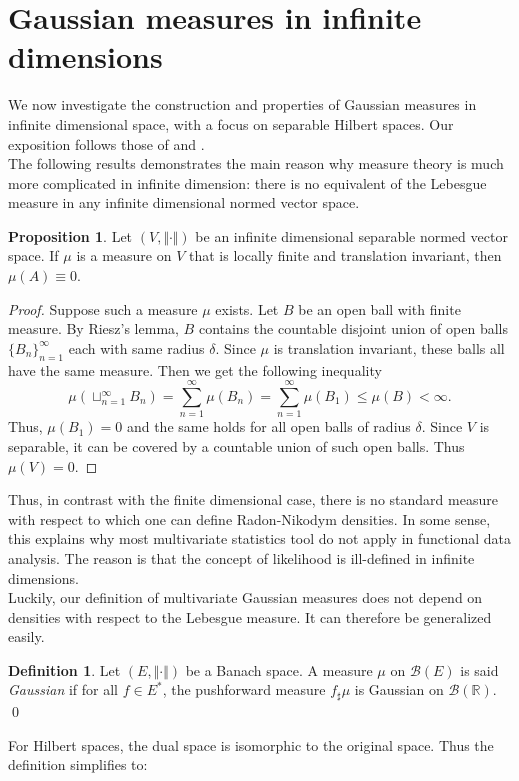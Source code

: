 \documentclass[10pt, a4paper]{report}
\newcommand{\R}[0]{\mathbb{R}}
\theoremstyle{definition}
\newtheorem{prop}{Proposition}
\newtheorem{definition}{Definition}
\theoremstyle{remark}
\begin{document}
\section{Gaussian measures in infinite dimensions}
We now investigate the construction and properties of Gaussian measures in infinite dimensional space, with a focus on separable Hilbert spaces. Our exposition follows those of \cite{prato1} and \cite{prato2}.\\
The following results demonstrates the main reason why measure theory is much more complicated in infinite dimension: there is no equivalent of the Lebesgue measure in any infinite dimensional normed vector space.
\begin{prop}
	Let $(V,\Vert \cdot \Vert)$ be an infinite dimensional separable normed vector space. If $\mu$ is a measure on $V$ that is locally finite and translation invariant, then $\mu(A) \equiv 0$. 
	\begin{proof}
		Suppose such a measure $\mu$ exists. Let $B$ be an open ball with finite measure. By Riesz's lemma, $B$ contains the countable disjoint union of open balls $\{B_n\}_{n=1}^\infty$ each with same radius $\delta$. Since $\mu$ is translation invariant, these balls all have the same measure. Then we get the following inequality
		$$\mu\left(\sqcup_{n=1}^\infty B_n\right) = \sum_{n=1}^{\infty}\mu(B_n) = \sum_{n=1}^{\infty}\mu(B_1) \leq \mu(B) < \infty.$$
		Thus, $\mu(B_1)=0$ and the same holds for all open balls of radius $\delta$. Since $V$ is separable, it can be covered by a countable union of such open balls. Thus $\mu(V)=0$.
	\end{proof}
\end{prop}
Thus, in contrast with the finite dimensional case, there is no standard measure with respect to which one can define Radon-Nikodym densities. In some sense, this explains why most multivariate statistics tool do not apply in functional data analysis. The reason is that the concept of likelihood is ill-defined in infinite dimensions.\\
Luckily, our definition of multivariate Gaussian measures does not depend on densities with respect to the Lebesgue measure. It can therefore be generalized easily.
\begin{definition}
	Let $(E,\Vert \cdot \Vert)$ be a Banach space. A measure $\mu$ on $\mathcal{B}(E)$ is said \emph{Gaussian} if for all $f \in E^*$, the pushforward measure $f_\sharp \mu$ is Gaussian on $\mathcal{B}(\R)$. \qed
\end{definition}
For Hilbert spaces, the dual space is isomorphic to the original space. Thus the definition simplifies to:
\end{document}

